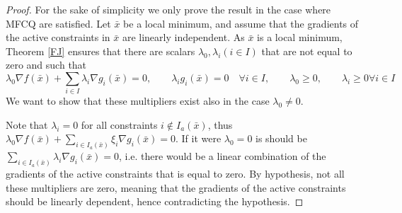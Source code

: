\documentclass{book}
\theoremstyle{theoremv2}
\theoremstyle{defv2}
\theoremstyle{remark}
\theoremstyle{remark}
\begin{document}
\begin{proof}
    For the sake of simplicity we only prove the result in the case where MFCQ are satisfied. Let $\bar{x}$ be a local minimum, and assume that the gradients of the active constraints in $\bar{x}$ are linearly independent. As $\bar{x}$ is a local minimum, Theorem \ref{FJ} ensures that there are scalars $\lambda_0,\lambda_i(i\in I)$ that are not equal to zero and such that 
    \[
        \lambda_0\nabla f(\bar{x}) + \displaystyle\sum_{i\in I}\lambda_i\nabla g_i(\bar{x})= 0, \qquad \lambda_i g_i(\bar{x}) = 0 \quad \forall i\in I, \qquad \lambda_0 \geq 0, \qquad \lambda_i \geq 0 \forall i \in I
    \]
    We want to show that these multipliers exist also in the case $\lambda_0\neq0$. 

    Note that $\lambda_i=0$ for all constraints $i \notin I_a(\bar{x})$, thus $\lambda_0\nabla f(\bar{x})+\sum_{i\in I_a(\bar{x})}\xi_i\nabla g_i(\bar{x})=0$. If it were $\lambda_0=0$ is should be $\sum_{i\in I_a(\bar{x})} \lambda_i\nabla g_i(\bar{x})=0$, i.e. there would be a linear combination of the gradients of the active constraints that is equal to zero. By hypothesis, not all these multipliers are zero, meaning that the gradients of the active constraints should be linearly dependent, hence contradicting the hypothesis.
\end{proof}
\end{document}

